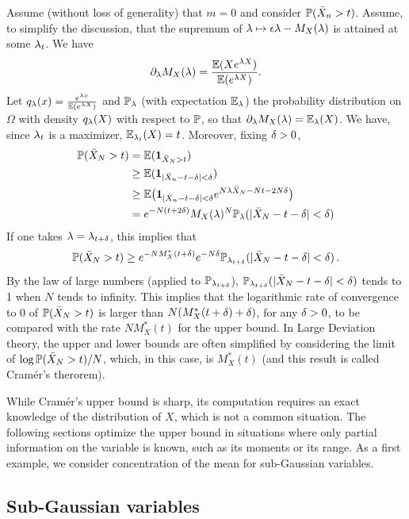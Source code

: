 Assume (without loss of generality) that $m=0$ and consider $\bm{\mathbb P}(\bar X_n > t)$. Assume, to simplify the discussion, that the supremum of $\lambda \mapsto \epsilon\lambda - M_X(\lambda)$ is attained at some $\lambda_t$. We have 
\[
\partial_\lambda M_X(\lambda) = \frac{\bm{\mathbb E}(Xe^{\lambda X})}{\bm{\mathbb E}(e^{\lambda X})}.
\]
Let $q_\lambda(x) = \frac{e^{\lambda x}}{\bm{\mathbb E}(e^{\lambda X})}$ and $\bm{\mathbb P}_\lambda$ (with expectation $\bm{\mathbb E}_\lambda$) the probability distribution on $\Omega$ with density $q_\lambda(X)$ with respect to $\bm{\mathbb P}$, so that $\partial_\lambda M_X(\lambda) = \bm{\mathbb E}_\lambda(X)$. We have, since $\lambda_t$ is a maximizer, $\bm{\mathbb E}_{\lambda_t}(X) = t$. Moreover, fixing $\delta >0$, 
\begin{align*}
\bm{\mathbb P}(\bar X_N > t) &= \bm{\mathbb E}({\bm 1}_{\bar X_N > t}) \\
& \geq   \bm{\mathbb E}({\bm 1}_{ |\bar X_n - t-\delta| < \delta}) \\
& \geq  \bm{\mathbb E}\big({\bm 1}_{ |\bar X_n - t -\delta| < \delta} e^{N\lambda \bar X_N - Nt - 2N\delta}\big) \\
& = e^{-N(t+2\delta)}  M_X(\lambda)^N \bm{\mathbb P}_\lambda ( |\bar X_N - t-\delta | < \delta)
\end{align*}
If one takes $\lambda = \lambda_{t+\delta}$, this implies that
\[
\bm{\mathbb P}(\bar X_N > t) \geq e^{-N M_X^*(t+\delta)} e^{-N\delta} \bm{\mathbb P}_{\lambda_{t+\delta}} ( |\bar X_N - t-\delta| < \delta)\,.
\]
By the law of large numbers (applied to $\bm{\mathbb P}_{\lambda_{t+\delta}}$), $\bm{\mathbb P}_{\lambda_{t+\delta}} ( |\bar X_N - t-\delta| < \delta)$ tends to 1 when $N$ tends to infinity. This implies that the logarithmic rate of convergence to 0 of $\bm{\mathbb P}(\bar X_N > t)$ is larger than $N(M_X^*(t+\delta) + \delta)$, for any $\delta>0$, to be compared with the rate $NM_X^*(t)$ for the upper bound.
In Large Deviation theory,  the upper and lower bounds are often simplified by considering the limit of 
$\log \bm{\mathbb P}(\bar X_N > t)/N$, which, in this case, is  $M_X^*(t)$ (and this result is called Cram\'er's therorem).  

 While Cram\'er's upper bound is sharp, its computation requires an exact knowledge of the distribution of $X$, which is not a common situation. 
The following sections optimize the upper bound in situations where only partial information on the variable is known, such as its moments or its range. As a first example, we consider concentration of the mean for sub-Gaussian variables.



\subsection{Sub-Gaussian variables}

